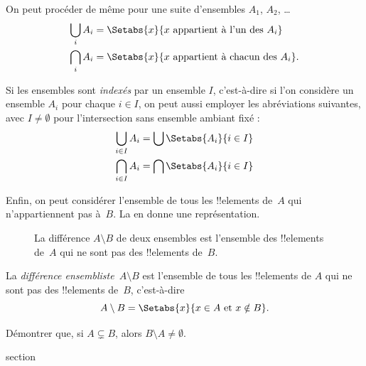 \documentclass[11pt,a4paper,openany]{memoir}
\begin{document}
On peut procéder de même pour une suite d'ensembles
$A_1$, $A_2$, \dots
\begin{align*}
\bigcup_i A_i & = \Setabs{x}{x \text{ appartient à l'un des } A_i}\\
\bigcap_i A_i & = \Setabs{x}{x \text{ appartient à chacun des } A_i}.
\end{align*}

Si les ensembles sont \emph{indexés} par un ensemble $I$,
c'est-à-dire si l'on considère un ensemble $A_i$ pour chaque
$i \in I$, on peut aussi employer les abréviations suivantes,
avec $I\neq\emptyset$ pour l'intersection sans ensemble ambiant fixé :
\begin{align*}
	\bigcup_{i \in I} A_i & = \bigcup \Setabs{A_i }{i \in I}\\
	\bigcap_{i \in I} A_i & = \bigcap\Setabs{A_i}{i \in I}
\end{align*}

Enfin, on peut considérer l'ensemble de tous les !!{element}s
de~$A$ qui n'appartiennent pas à~$B$. La 
en donne une représentation.

\begin{figure}
  \caption{La différence $A \setminus B$ de deux ensembles
    est l'ensemble des !!{element}s de~$A$ qui ne sont pas
    des !!{element}s de~$B$.}
\end{figure}

\begin{defn}[Différence]
La \emph{différence ensembliste}~$A \setminus B$ est l'ensemble
de tous les !!{element}s de $A$ qui ne sont pas des !!{element}s
de~$B$, c'est-à-dire
\[
A\setminus B = \Setabs{x}{x\in A \text{ et } x \notin B}.
\]
\end{defn}

\begin{prob}
	Démontrer que, si $A \subsetneq B$,
	alors $B \setminus A \neq \emptyset$.
\end{prob}


\endgroup



\begingroup
\expandafter\def\csname ol@sectioncs\endcsname{section}
\def\olfilename{pairs-and-products}


\end{document}
